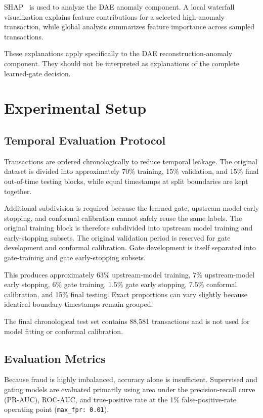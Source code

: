 \documentclass[conference]{IEEEtran}
\begin{document}
SHAP~\cite{lundberg2017unified} is used to analyze the DAE anomaly component.
A local waterfall visualization explains feature contributions for a selected
high-anomaly transaction, while global analysis summarizes feature importance
across sampled transactions.

These explanations apply specifically to the DAE reconstruction-anomaly
component. They should not be interpreted as explanations of the complete
learned-gate decision.

\section{Experimental Setup}
\label{sec:setup}

\subsection{Temporal Evaluation Protocol}

Transactions are ordered chronologically to reduce temporal leakage. The
original dataset is divided into approximately 70\% training, 15\% validation,
and 15\% final out-of-time testing blocks, while equal timestamps at split
boundaries are kept together.

Additional subdivision is required because the learned gate, upstream model
early stopping, and conformal calibration cannot safely reuse the same labels.
The original training block is therefore subdivided into upstream model
training and early-stopping subsets. The original validation period is reserved
for gate development and conformal calibration. Gate development is itself
separated into gate-training and gate early-stopping subsets.

This produces approximately 63\% upstream-model training, 7\% upstream-model
early stopping, 6\% gate training, 1.5\% gate early stopping, 7.5\% conformal
calibration, and 15\% final testing. Exact proportions can vary slightly because
identical boundary timestamps remain grouped.

The final chronological test set contains 88,581 transactions and is not used
for model fitting or conformal calibration.

\subsection{Evaluation Metrics}

Because fraud is highly imbalanced, accuracy alone is insufficient. Supervised
and gating models are evaluated primarily using area under the precision-recall
curve (PR-AUC), ROC-AUC, and true-positive rate at the 1\% false-positive-rate
operating point (\texttt{max\_fpr: 0.01}).
\end{document}
